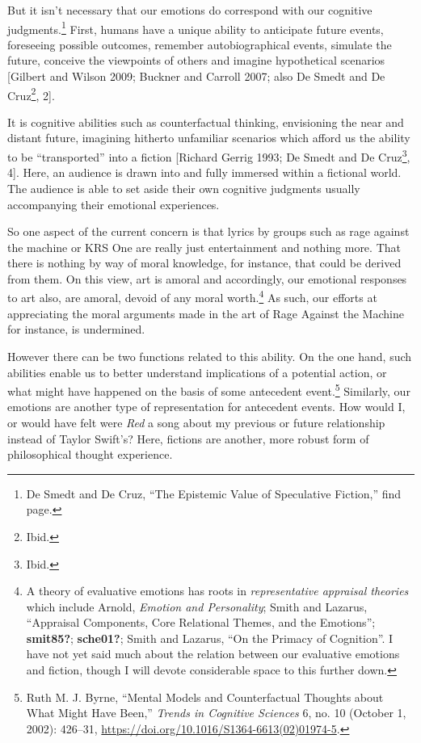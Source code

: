 \documentclass[phdthesis,12pt,final]{wuthesis}
\theoremstyle{definition}
\theoremstyle{definition}
\theoremstyle{definition}
\theoremstyle{definition}
\theoremstyle{remark}
\begin{document}
But it isn't necessary that our emotions do correspond with our cognitive judgments.\footnote{De Smedt and De Cruz, {``The Epistemic Value of Speculative Fiction,''} find page.} First, humans have a unique ability to anticipate future events, foreseeing possible outcomes, remember autobiographical events, simulate the future, conceive the viewpoints of others and imagine hypothetical scenarios {[}Gilbert and Wilson 2009; Buckner and Carroll 2007; also De Smedt and De Cruz\footnote{Ibid.}, 2{]}.

It is cognitive abilities such as counterfactual thinking, envisioning the near and distant future, imagining hitherto unfamiliar scenarios which afford us the ability to be ``transported'' into a fiction {[}Richard Gerrig 1993; De Smedt and De Cruz\footnote{Ibid.}, 4{]}. Here, an audience is drawn into and fully immersed within a fictional world. The audience is able to set aside their own cognitive judgments usually accompanying their emotional experiences.

So one aspect of the current concern is that lyrics by groups such as rage against the machine or KRS One are really just entertainment and nothing more. That there is nothing by way of moral knowledge, for instance, that could be derived from them. On this view, art is amoral and accordingly, our emotional responses to art also, are amoral, devoid of any moral worth.\footnote{A theory of evaluative emotions has roots in \emph{representative appraisal theories} which include Arnold, \emph{Emotion and {Personality}}; Smith and Lazarus, {``Appraisal {Components}, {Core Relational Themes}, and the {Emotions}''}; \textbf{smit85?}; \textbf{sche01?}; Smith and Lazarus, {``On the {Primacy} of {Cognition}''}. I have not yet said much about the relation between our evaluative emotions and fiction, though I will devote considerable space to this further down.} As such, our efforts at appreciating the moral arguments made in the art of Rage Against the Machine for instance, is undermined.

However there can be two functions related to this ability. On the one hand, such abilities enable us to better understand implications of a potential action, or what might have happened on the basis of some antecedent event.\footnote{Ruth M. J. Byrne, {``Mental Models and Counterfactual Thoughts about What Might Have Been,''} \emph{Trends in Cognitive Sciences} 6, no. 10 (October 1, 2002): 426--31, \url{https://doi.org/10.1016/S1364-6613(02)01974-5}.} Similarly, our emotions are another type of representation for antecedent events. How would I, or would have felt were \emph{Red} a song about my previous or future relationship instead of Taylor Swift's? Here, fictions are another, more robust form of philosophical thought experience.
\end{document}
